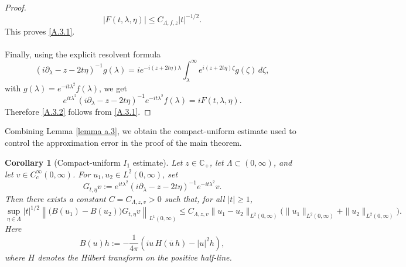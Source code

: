 \documentclass[10pt]{article}
\newtheorem{corollary}[theorem]{Corollary}
\numberwithin{equation}{section}
\numberwithin{theorem}{section}
\begin{document}
\begin{appendix}
\begin{proof}
\[|F(t,\lambda,\eta)|
\le
C_{\Lambda,f,z}|t|^{-1/2}.
\]
This proves \eqref{A.3.1}.\\\\
Finally, using the explicit resolvent formula
\[
(i\partial_\lambda-z-2t\eta)^{-1}g(\lambda)
=
i e^{-i(z+2t\eta)\lambda}
\int_\lambda^\infty
e^{i(z+2t\eta)\zeta}g(\zeta)\,d\zeta,
\]
with \(g(\lambda)=e^{-it\lambda^2}f(\lambda)\), we get
\[
e^{it\lambda^2}
(i\partial_\lambda-z-2t\eta)^{-1}
e^{-it\lambda^2}f(\lambda)
=
iF(t,\lambda,\eta).
\]
Therefore \eqref{A.3.2} follows from \eqref{A.3.1}.
\end{proof}
Combining Lemma \ref{lemma a.3}, we obtain the compact-uniform estimate used to control the
approximation error in the proof of the main theorem.
\begin{corollary}[Compact-uniform \(I_1\) estimate]
\label{corollary a.4}
Let \(z\in\mathbb C_+\), let \(\Lambda\subset(0,\infty)\), and let
\(v\in C_c^\infty(0,\infty)\). For \(u_1,u_2\in L^2(0,\infty)\), set
\[
G_{t,\eta}v
:=
e^{it\lambda^2}
(i\partial_\lambda-z-2t\eta)^{-1}
e^{-it\lambda^2}v .
\]
Then there exists a constant \(C=C_{\Lambda,z,v}>0\) such that, for all \(|t|\ge1\),
\begin{equation}
\label{A.3.4}
\sup_{\eta\in\Lambda}
|t|^{1/2}
\left\|
\bigl(B(u_1)-B(u_2)\bigr)G_{t,\eta}v
\right\|_{L^1(0,\infty)}
\le
C_{\Lambda,z,v}
\|u_1-u_2\|_{L^2(0,\infty)}
\bigl(
\|u_1\|_{L^2(0,\infty)}
+
\|u_2\|_{L^2(0,\infty)}
\bigr).
\end{equation}
Here
\[
B(u)h
:=
-\frac1{4\pi}
\left(
iu\,H(\overline u\,h)-|u|^2h
\right),
\]
where \(H\) denotes the Hilbert transform on the positive half-line.
\end{corollary}


\end{appendix}
\end{document}
